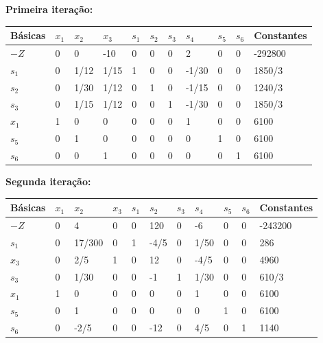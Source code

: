 \documentclass[12pt, a4paper]{article}
\begin{document}
\textbf{Primeira iteração:}
\begin{center}
\begin{tabular}{lllllllllll}
\toprule
Básicas & $x_1$ & $x_2$ & $x_3$ & $s_1$ & $s_2$ & $s_3$ & $s_4$ & $s_5$ & $s_6$ & Constantes \\
\midrule
$-Z$ & 0 & 0 & -10 & 0 & 0 & 0 & 2 & 0 & 0 & -292800 \\
$s_1$ & 0 & 1/12 & 1/15 & 1 & 0 & 0 & -1/30 & 0 & 0 & 1850/3 \\
$s_2$ & 0 & 1/30 & 1/12 & 0 & 1 & 0 & -1/15 & 0 & 0 & 1240/3 \\
$s_3$ & 0 & 1/15 & 1/12 & 0 & 0 & 1 & -1/30 & 0 & 0 & 1850/3 \\
$x_1$ & 1 & 0 & 0 & 0 & 0 & 0 & 1 & 0 & 0 & 6100 \\
$s_5$ & 0 & 1 & 0 & 0 & 0 & 0 & 0 & 1 & 0 & 6100 \\
$s_6$ & 0 & 0 & 1 & 0 & 0 & 0 & 0 & 0 & 1 & 6100 \\
\bottomrule
\end{tabular}
\end{center}

\textbf{Segunda iteração:}
\begin{center}
\begin{tabular}{lllllllllll}
\toprule
Básicas & $x_1$ & $x_2$ & $x_3$ & $s_1$ & $s_2$ & $s_3$ & $s_4$ & $s_5$ & $s_6$ & Constantes \\
\midrule
$-Z$ & 0 & 4 & 0 & 0 & 120 & 0 & -6 & 0 & 0 & -243200 \\
$s_1$ & 0 & 17/300 & 0 & 1 & -4/5 & 0 & 1/50 & 0 & 0 & 286 \\
$x_3$ & 0 & 2/5 & 1 & 0 & 12 & 0 & -4/5 & 0 & 0 & 4960 \\
$s_3$ & 0 & 1/30 & 0 & 0 & -1 & 1 & 1/30 & 0 & 0 & 610/3 \\
$x_1$ & 1 & 0 & 0 & 0 & 0 & 0 & 1 & 0 & 0 & 6100 \\
$s_5$ & 0 & 1 & 0 & 0 & 0 & 0 & 0 & 1 & 0 & 6100 \\
$s_6$ & 0 & -2/5 & 0 & 0 & -12 & 0 & 4/5 & 0 & 1 & 1140 \\
\bottomrule
\end{tabular}
\end{center}
\end{document}
